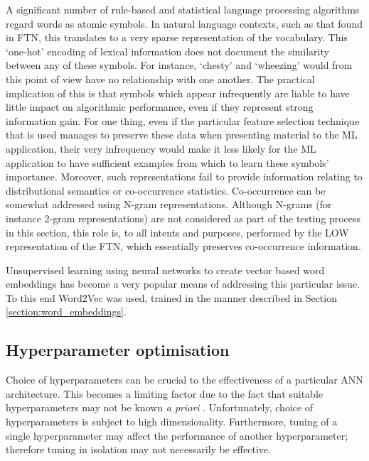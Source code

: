 A significant number of rule-based and statistical language processing algorithms regard
words as atomic symbols. In natural language contexts, such as that found in FTN, this translates to a very sparse representation of the vocabulary. This `one-hot' encoding of lexical information does not document the similarity between any of these symbols. For instance, `chesty' and `wheezing' would from this point of view have no relationship with one another. The practical implication of this is that symbols which appear infrequently are liable to have little impact on algorithmic performance, even if they represent strong information gain. For one thing, even if the particular feature selection technique that is used manages to preserve these data when presenting material to the ML application, their very infrequency would make it less likely for the ML application to have sufficient examples from which to learn these symbols' importance. Moreover, such representations fail to provide information relating to   distributional semantics or co-occurrence statistics. Co-occurrence can be somewhat addressed using N-gram representations. Although N-grams (for instance 2-gram representations) are not considered as part of the testing process in this section, this role is, to all intents and purposes, performed by the LOW representation of the FTN, which essentially preserves co-occurrence information.    

Unsupervised learning using neural networks to create vector based word embeddings has become a very popular means of addressing this particular issue. To this end Word2Vec was used, trained in the manner described in Section \ref{section:word_embeddings}.






\subsection{Hyperparameter optimisation}
\label{section-hyperparemter-optimisation}


  





Choice of hyperparameters can be crucial to the effectiveness of a particular ANN architecture. This becomes a limiting factor due to the fact that suitable hyperparameters may not be known \textit{a priori} \cite{zhou2018exploring,zheng2019hyperparameter}. Unfortunately, choice of hyperparameters is subject to high dimensionality.  Furthermore, tuning of a single hyperparameter may affect the performance of another hyperparameter; therefore tuning in isolation may not necessarily be effective. 

